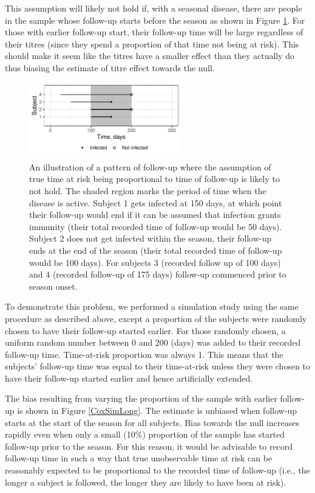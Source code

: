 This assumption will likely not hold if, with a seasonal disease, there are people in the sample whose follow-up starts before the season as shown in Figure \ref{CoxNotIdeal}. For those with earlier follow-up start, their follow-up time will be large regardless of their titres (since they spend a proportion of that time not being at risk). This should make it seem like the titres have a smaller effect than they actually do thus biasing the estimate of titre effect towards the null.

\begin{figure}[htp]
	\centering
	\includegraphics[width=0.59\textwidth]{../curve-cox/timeplot_4_light.pdf}
	\caption{
	An illustration of a pattern of follow-up where the assumption of true time at risk being proportional to time of follow-up is likely to not hold. The shaded region marks the period of time when the disease is active. Subject 1 gets infected at 150 days, at which point their follow-up would end if it can be assumed that infection grants immunity (their total recorded time of follow-up would be 50 days). Subject 2 does not get infected within the season, their follow-up ends at the end of the season (their total recorded time of follow-up would be 100 days). For subjects 3 (recorded follow up of 100 days) and 4 (recorded follow-up of 175 days) follow-up commenced prior to season onset.
	}
	\label{CoxNotIdeal}
\end{figure}

To demonstrate this problem, we performed a simulation study using the same procedure as described above, except a proportion of the subjects were randomly chosen to have their follow-up started earlier. For those randomly chosen, a uniform random number between 0 and 200 (days) was added to their recorded follow-up time. Time-at-risk proportion was always 1. This means that the subjects' follow-up time was equal to their time-at-risk unless they were chosen to have their follow-up started earlier and hence artificially extended.

The bias resulting from varying the proportion of the sample with earlier follow-up is shown in Figure \ref{CoxSimLong}. The estimate is unbiased when follow-up starts at the start of the season for all subjects. Bias towards the null increases rapidly even when only a small (10\%) proportion of the sample has started follow-up prior to the season. For this reason, it would be advisable to record follow-up time in such a way that true unobservable time at risk can be reasonably expected to be proportional to the recorded time of follow-up (i.e., the longer a subject is followed, the longer they are likely to have been at risk).


